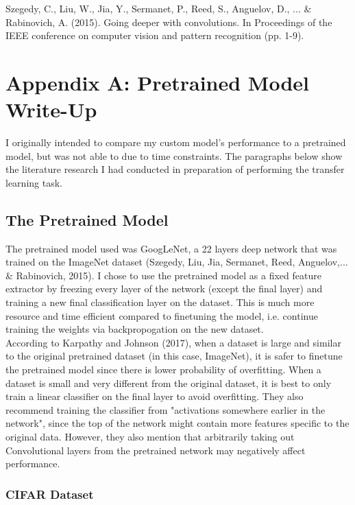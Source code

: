 \documentclass[11pt]{article}
\begin{document}
Szegedy, C., Liu, W., Jia, Y., Sermanet, P., Reed, S., Anguelov, D., ...
\& Rabinovich, A. (2015). Going deeper with convolutions. In Proceedings
of the IEEE conference on computer vision and pattern recognition (pp.
1-9).\\

\newpage
    \section*{Appendix A: Pretrained Model Write-Up}\label{appendix}

I originally intended to compare my custom model's performance to a
pretrained model, but was not able to due to time constraints. The
paragraphs below show the literature research I had conducted in
preparation of performing the transfer learning task.

\subsection*{The Pretrained Model}\label{the-pretrained-model}

The pretrained model used was GoogLeNet, a 22 layers deep network that
was trained on the ImageNet dataset (Szegedy, Liu, Jia, Sermanet, Reed,
Anguelov,... \& Rabinovich, 2015). I chose to use the pretrained model
as a fixed feature extractor by freezing every layer of the network
(except the final layer) and training a new final classification layer
on the dataset. This is much more resource and time efficient compared
to finetuning the model, i.e. continue training the weights via
backpropogation on the new dataset.\\

According to Karpathy and Johnson (2017), when a dataset is large and
similar to the original pretrained dataset (in this case, ImageNet), it
is safer to finetune the pretrained model since there is lower
probability of overfitting. When a dataset is small and very different
from the original dataset, it is best to only train a linear classifier
on the final layer to avoid overfitting. They also recommend training
the classifier from "activations somewhere earlier in the network",
since the top of the network might contain more features specific to the
original data. However, they also mention that arbitrarily taking out
Convolutional layers from the pretrained network may negatively affect
performance.

\subsubsection*{CIFAR Dataset}\label{cifar-dataset}
\end{document}

